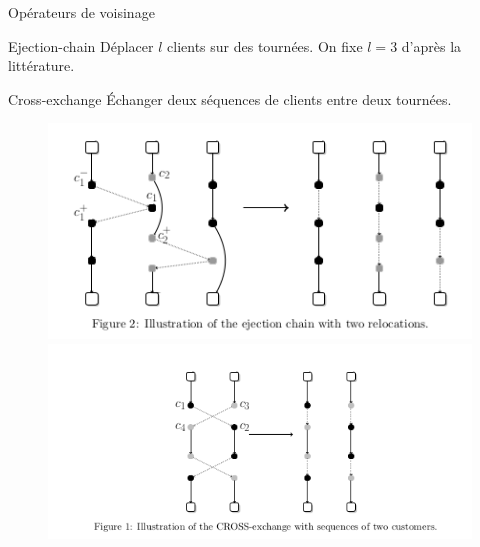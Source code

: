 \documentclass{beamer}
\begin{document}
\begin{frame}{Opérateurs de voisinage}
\begin{block}{Ejection-chain}
Déplacer $l$ clients sur des tournées. On fixe \textcolor{vert}{ $l = 3$} d'après la littérature.
\end{block}
\begin{block}{Cross-exchange}
Échanger deux séquences de clients entre deux tournées. 
\end{block}
\begin{figure}
	\centering
	\includegraphics[scale=0.3]{ejection_chain.png}
	\includegraphics[scale=0.3]{cross_exchange.png}
\end{figure}

\end{frame}
\end{document}
